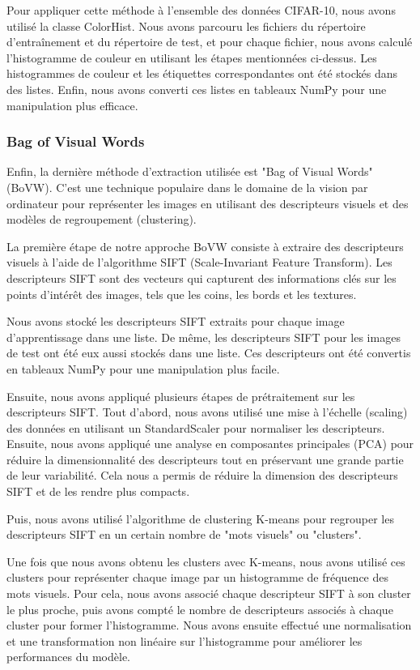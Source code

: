 Pour appliquer cette méthode à l'ensemble des données CIFAR-10, nous avons utilisé la classe ColorHist. Nous avons parcouru les fichiers du répertoire d'entraînement et du répertoire de test, et pour chaque fichier, nous avons calculé l'histogramme de couleur en utilisant les étapes mentionnées ci-dessus. Les histogrammes de couleur et les étiquettes correspondantes ont été stockés dans des listes. Enfin, nous avons converti ces listes en tableaux NumPy pour une manipulation plus efficace.

\subsubsection{Bag of Visual Words}

Enfin, la dernière méthode d'extraction utilisée est  "Bag of Visual Words" (BoVW). C'est une technique populaire dans le domaine de la vision par ordinateur pour représenter les images en utilisant des descripteurs visuels et des modèles de regroupement (clustering).

La première étape de notre approche BoVW consiste à extraire des descripteurs visuels à l'aide de l'algorithme SIFT (Scale-Invariant Feature Transform). Les descripteurs SIFT sont des vecteurs qui capturent des informations clés sur les points d'intérêt des images, tels que les coins, les bords et les textures.

Nous avons stocké les descripteurs SIFT extraits pour chaque image d'apprentissage dans une liste. De même, les descripteurs SIFT pour les images de test ont été eux aussi stockés dans une liste. Ces descripteurs ont été convertis en tableaux NumPy pour une manipulation plus facile.

Ensuite, nous avons appliqué plusieurs étapes de prétraitement sur les descripteurs SIFT. Tout d'abord, nous avons utilisé une mise à l'échelle (scaling) des données en utilisant un StandardScaler pour normaliser les descripteurs. Ensuite, nous avons appliqué une analyse en composantes principales (PCA) pour réduire la dimensionnalité des descripteurs tout en préservant une grande partie de leur variabilité. Cela nous a permis de réduire la dimension des descripteurs SIFT et de les rendre plus compacts.

Puis, nous avons utilisé l'algorithme de clustering K-means pour regrouper les descripteurs SIFT en un certain nombre de "mots visuels" ou "clusters".

Une fois que nous avons obtenu les clusters avec K-means, nous avons utilisé ces clusters pour représenter chaque image par un histogramme de fréquence des mots visuels. Pour cela, nous avons associé chaque descripteur SIFT à son cluster le plus proche, puis avons compté le nombre de descripteurs associés à chaque cluster pour former l'histogramme. Nous avons ensuite effectué une normalisation et une transformation non linéaire sur l'histogramme pour améliorer les performances du modèle.

